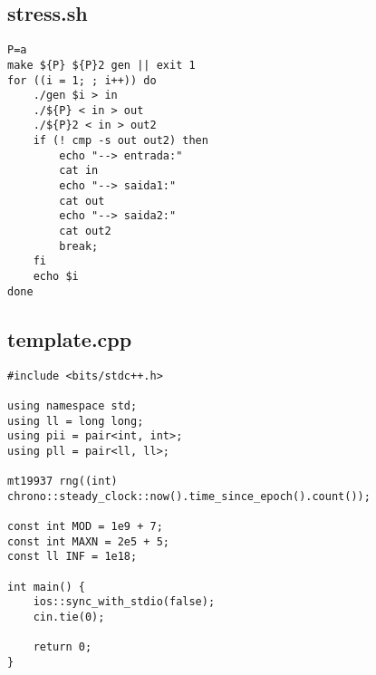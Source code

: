 \documentclass[12pt, a4paper, twoside]{article}
\begin{document}
\subsection{stress.sh}
\begin{lstlisting}
P=a
make ${P} ${P}2 gen || exit 1
for ((i = 1; ; i++)) do
	./gen $i > in
	./${P} < in > out
	./${P}2 < in > out2
	if (! cmp -s out out2) then
		echo "--> entrada:"
		cat in
		echo "--> saida1:"
		cat out
		echo "--> saida2:"
		cat out2
		break;
	fi
	echo $i
done
\end{lstlisting}

\subsection{template.cpp}
\begin{lstlisting}
#include <bits/stdc++.h>

using namespace std;
using ll = long long;
using pii = pair<int, int>;
using pll = pair<ll, ll>;

mt19937 rng((int) chrono::steady_clock::now().time_since_epoch().count());

const int MOD = 1e9 + 7;
const int MAXN = 2e5 + 5;
const ll INF = 1e18;

int main() {
	ios::sync_with_stdio(false);
	cin.tie(0);

	return 0;
}
\end{lstlisting}
\end{document}
